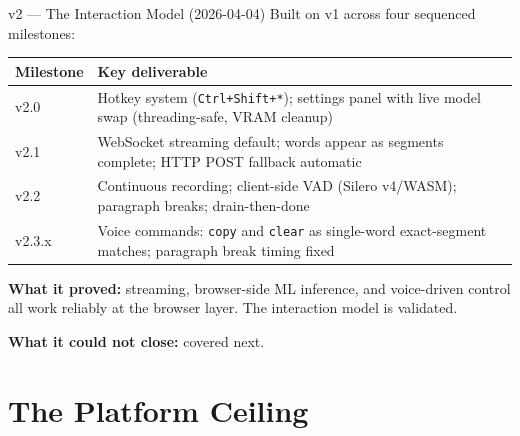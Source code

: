 \documentclass{beamer}
\begin{document}
\begin{frame}{v2 --- The Interaction Model (2026-04-04)}
    \small
    Built on v1 across four sequenced milestones:

    \vspace{0.3em}
    \begin{table}
    \centering\footnotesize
    \begin{tabular}{@{} l p{7.8cm} @{}}
        \toprule
        \textbf{Milestone} & \textbf{Key deliverable} \\
        \midrule
        v2.0 & Hotkey system (\texttt{Ctrl+Shift+*}); settings panel with
               live model swap (threading-safe, VRAM cleanup) \\
        v2.1 & WebSocket streaming default; words appear as segments complete;
               HTTP POST fallback automatic \\
        v2.2 & Continuous recording; client-side VAD (Silero v4/WASM);
               paragraph breaks; drain-then-done \\
        v2.3.x & Voice commands: \texttt{copy} and \texttt{clear} as single-word
                 exact-segment matches; paragraph break timing fixed \\
        \bottomrule
    \end{tabular}
    \end{table}

    \vspace{0.3em}
    \textbf{What it proved:} streaming, browser-side ML inference, and voice-driven control
    all work reliably at the browser layer. The interaction model is validated.

    \vspace{0.1em}
    \textbf{What it could not close:} covered next.
\end{frame}


\section{The Platform Ceiling}
\end{document}
